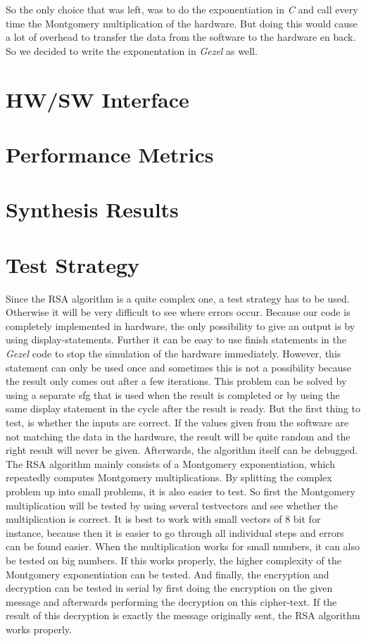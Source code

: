 \documentclass[a4paper]{article}
\begin{document}
So the only choice that was left, was to do the exponentiation in \textit{C} and call every time the Montgomery multiplication of the hardware. But doing this would cause a lot of overhead to transfer the data from the software to the hardware en back. So we decided to write the exponentation in \textit{Gezel} as well.

\section{HW/SW Interface}

\section{Performance Metrics}

\section{Synthesis Results}

\section{Test Strategy}

Since the RSA algorithm is a quite complex one, a test strategy has to be used. Otherwise it will be very difficult to see where errors occur. Because our code is completely implemented in hardware, the only possibility to give an output is by using display-statements. Further it can be easy to use finish statements in the \textit{Gezel} code to stop the simulation of the hardware immediately. However, this statement can only be used once and sometimes this is not a possibility because the result only comes out after a few iterations. This problem can be solved by using a separate sfg that is used when the result is completed or by using the same display statement in the cycle after the result is ready. But the first thing to test, is whether the inputs are correct. If the values given from the software are not matching the data in the hardware, the result will be quite random and the right result will never be given. Afterwards, the algorithm itself can be debugged.\\

The RSA algorithm mainly consists of a Montgomery exponentiation, which repeatedly computes Montgomery multiplications. By splitting the complex problem up into small problems, it is also easier to test. So first the Montgomery multiplication will be tested by using several testvectors and see whether the multiplication is correct. It is best to work with small vectors of 8 bit for instance, because then it is easier to go through all individual steps and errors can be found easier. When the multiplication works for small numbers, it can also be tested on big numbers. If this works properly, the higher complexity of the Montgomery exponentiation can be tested. And finally, the encryption and decryption can be tested in serial by first doing the encryption on the given message and afterwards performing the decryption on this cipher-text. If the result of this decryption is exactly the message originally sent, the RSA algorithm works properly.\\
\end{document}
